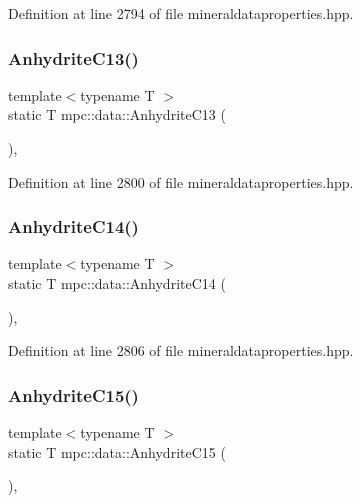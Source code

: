 Definition at line 2794 of file mineraldataproperties.\+hpp.

\mbox{\label{namespacempc_1_1data_a27dca2248dc930c663f1ed42f5eaf4b8}} 
\subsubsection{\texorpdfstring{Anhydrite\+C13()}{AnhydriteC13()}}
{\footnotesize\ttfamily template$<$typename T $>$ \\
static T mpc\+::data\+::\+Anhydrite\+C13 (\begin{DoxyParamCaption}{ }\end{DoxyParamCaption})\hspace{0.3cm}{\ttfamily [inline]}, {\ttfamily [static]}}



Definition at line 2800 of file mineraldataproperties.\+hpp.

\mbox{\label{namespacempc_1_1data_a0dfb46d63acc9b3c6bbab6c08284b435}} 
\subsubsection{\texorpdfstring{Anhydrite\+C14()}{AnhydriteC14()}}
{\footnotesize\ttfamily template$<$typename T $>$ \\
static T mpc\+::data\+::\+Anhydrite\+C14 (\begin{DoxyParamCaption}{ }\end{DoxyParamCaption})\hspace{0.3cm}{\ttfamily [inline]}, {\ttfamily [static]}}



Definition at line 2806 of file mineraldataproperties.\+hpp.

\mbox{\label{namespacempc_1_1data_a7c0f0d617fd45d9795c68cb1777bf53b}} 
\subsubsection{\texorpdfstring{Anhydrite\+C15()}{AnhydriteC15()}}
{\footnotesize\ttfamily template$<$typename T $>$ \\
static T mpc\+::data\+::\+Anhydrite\+C15 (\begin{DoxyParamCaption}{ }\end{DoxyParamCaption})\hspace{0.3cm}{\ttfamily [inline]}, {\ttfamily [static]}}



